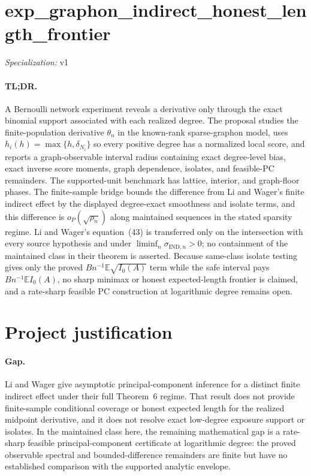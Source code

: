 \documentclass{article}
\begin{document}
\sloppy

\section*{exp\_\allowbreak{}graphon\_\allowbreak{}indirect\_\allowbreak{}honest\_\allowbreak{}length\_\allowbreak{}frontier}

\noindent\textit{Specialization:} v1\par

\paragraph{TL;DR.} A Bernoulli network experiment reveals a derivative only through the exact binomial support associated with each realized degree. The proposal studies the finite-population derivative \(\theta_n\) in the known-rank sparse-graphon model, uses \(h_i(h)=\max\{h,\delta_{N_i}\}\) so every positive degree has a normalized local score, and reports a graph-observable interval radius containing exact degree-level bias, exact inverse score moments, graph dependence, isolates, and feasible-PC remainders. The supported-unit benchmark has lattice, interior, and graph-floor phases. The finite-sample bridge bounds the difference from Li and Wager's finite indirect effect by the displayed degree-exact smoothness and isolate terms, and this difference is \(o_P(\sqrt{\rho_n})\) along maintained sequences in the stated sparsity regime. Li and Wager's equation~(43) is transferred only on the intersection with every source hypothesis and under \(\liminf_n\sigma_{\mathrm{IND},n}>0\); no containment of the maintained class in their theorem is asserted. Because same-class isolate testing gives only the proved \(Bn^{-1}\mathbb E\sqrt{I_0(A)}\) term while the safe interval pays \(Bn^{-1}\mathbb E I_0(A)\), no sharp minimax or honest expected-length frontier is claimed, and a rate-sharp feasible PC construction at logarithmic degree remains open.

\section{Project justification}

\paragraph{Gap.} Li and Wager give asymptotic principal-component inference for a distinct finite indirect effect under their full Theorem~6 regime.  That result does not provide finite-sample conditional coverage or honest expected length for the realized midpoint derivative, and it does not resolve exact low-degree exposure support or isolates.  In the maintained class here, the remaining mathematical gap is a rate-sharp feasible principal-component certificate at logarithmic degree: the proved observable spectral and bounded-difference remainders are finite but have no established comparison with the supported analytic envelope.
\end{document}
